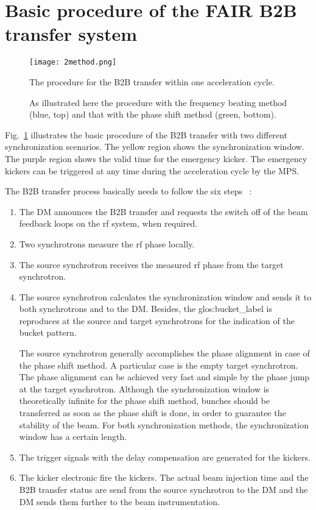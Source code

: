 \section{Basic procedure of the FAIR B2B transfer system}
\begin{figure}[!htb]
   \centering   
   \texttt{[image: 2method.png]}
   \caption{The procedure for the B2B transfer within one acceleration cycle.}
	\caption*{As illustrated here the procedure with the frequency beating method (blue, top) and that with the phase shift method (green, bottom).}
   \label{2method}
\end{figure}
Fig.~\ref{2method} illustrates the basic procedure of the B2B transfer with two different synchronization scenarios. The yellow region shows the synchronization window. The purple region shows the valid time for the emergency kicker. The emergency kickers can be triggered at any time during the acceleration cycle by the MPS.  


The B2B transfer process basically needs to follow the six steps ~\cite{bai_bunch_2015}:
\begin{enumerate}
\item The DM announces the B2B transfer and requests the switch off of the beam feedback loops on the rf system, when required.
\item Two synchrotrons measure the rf phase locally.
\item The source synchrotron receives the measured rf phase from the target synchrotron.
\item The source synchrotron calculates the synchronization window and sends it to both synchrotrons and to the DM. Besides, the \gls{glos:bucket_label} is reproduces at the source and target synchrotrons for the indication of the bucket pattern.

The source synchrotron generally accomplishes the phase alignment in case of the phase shift method. A particular case is the empty target synchrotron. The phase alignment can be achieved very fast and simple by the phase jump at the target synchrotron. Although the synchronization window is theoretically infinite for the phase shift method, bunches should be transferred as soon as the phase shift is done, in order to guarantee the stability of the beam. For both synchronization methods, the synchronization window has a certain length.

\item The trigger signals with the delay compensation are generated for the kickers.
\item The kicker electronic fire the kickers. The actual beam injection time and the B2B transfer status are send from the source synchrotron to the DM and the DM sends them further to the beam instrumentation.

\end{enumerate}



